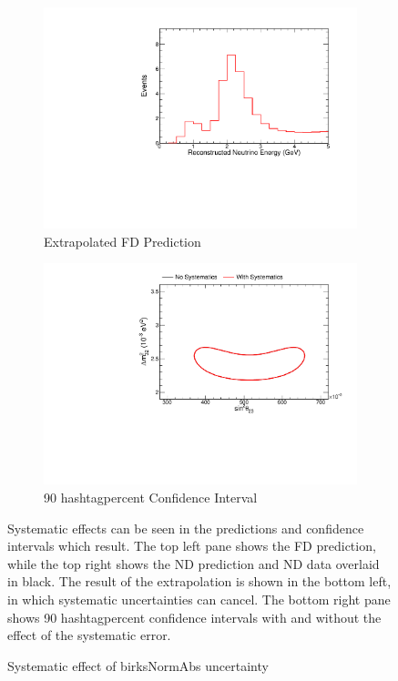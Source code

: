 {\begin{figure}
\begin{center}
\begin{subfigure}[c]{0.49\textwidth}
\includegraphics[width=\textwidth]{figures/systs/prediction/fd_extrap_prediction_birksNormAbs.pdf}
\caption*{Extrapolated FD Prediction}
\end{subfigure}
\begin{subfigure}[c]{0.49\textwidth}
\includegraphics[width=\textwidth]{figures/systs/prediction/fd_extrap_contour_birksNormAbs.pdf}
\caption*{90 hashtagpercent Confidence Interval}
\end{subfigure}
\end{center}
\caption{Systematic effect of birksNormAbs uncertainty}{
Systematic effects can be seen in the predictions and confidence intervals
which result.
The top left pane shows the FD prediction, while the top right shows the
ND prediction and ND data overlaid in black.
The result of the extrapolation is shown in the bottom left, in which
systematic uncertainties can cancel.
The bottom right pane shows 90 hashtagpercent confidence intervals with and without
the effect of the systematic error.}
\label{syst_fig_birksNormAbs}


\end{figure}}
